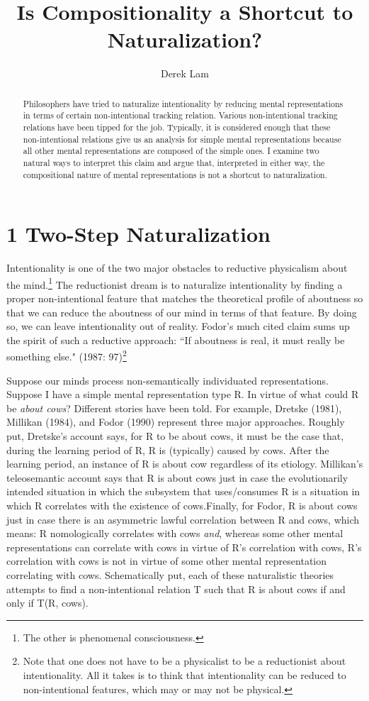 \documentclass[a4paper,12pt]{article}
\title{\textbf{Is Compositionality a Shortcut to Naturalization?}}
\author{Derek Lam}
\begin{document}
\maketitle

\begin{abstract}
Philosophers have tried to naturalize intentionality by reducing mental representations in terms of certain non-intentional tracking relation. Various non-intentional tracking relations have been tipped for the job. Typically, it is considered enough that these non-intentional relations give us an analysis for simple mental representations because all other mental representations are composed of the simple ones. I examine two natural ways to interpret this claim and argue that, interpreted in either way, the compositional nature of mental representations is not a shortcut to naturalization.
\end{abstract}

\section*{1 Two-Step Naturalization}
Intentionality is one of the two major obstacles to reductive physicalism about the mind.\footnote{The other is phenomenal consciousness.} The reductionist dream is to naturalize intentionality by finding a proper non-intentional feature that matches the theoretical profile of aboutness so that we can reduce the aboutness of our mind in terms of that feature. By doing so, we can leave intentionality out of reality. Fodor's much cited claim sums up the spirit of such a reductive approach: ``If aboutness is real, it must really be something else." (1987: 97)\footnote{Note that one does not have to be a physicalist to be a reductionist about intentionality. All it takes is to think that intentionality can be reduced to non-intentional features, which may or may not be physical.}

Suppose our minds process non-semantically individuated representations. Suppose I have a simple mental representation type R. In virtue of what could R be \emph{about cows}? Different stories have been told. For example, Dretske (1981), Millikan (1984), and Fodor (1990) represent three major approaches. Roughly put, Dretske's account says, for R to be about cows, it must be the case that, during the learning period of R, R is (typically) caused by cows. After the learning period, an instance of R is about cow regardless of its etiology. Millikan's teleosemantic account says that R is about cows just in case the evolutionarily intended situation in which the subsystem that uses/consumes R is a situation in which R correlates with the existence of cows.\footnotemark Finally, for Fodor, R is about cows just in case there is an asymmetric lawful correlation between R and cows, which means: R nomologically correlates with cows \emph{and}, whereas some other mental representations can correlate with cows in virtue of R's correlation with cows, R's correlation with cows is not in virtue of some other mental representation correlating with cows. Schematically put, each of these naturalistic theories attempts to find a non-intentional relation T such that R is about cows if and only if T(R, cows).
\end{document}
